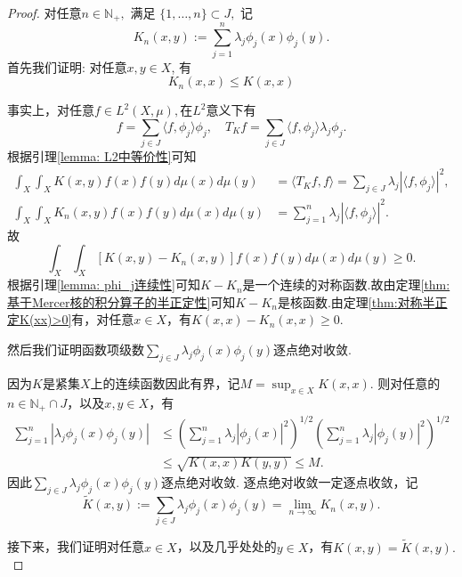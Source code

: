 \documentclass[12pt, a4paper, oneside]{ctexbook}
\begin{document}
\begin{proof}
     对任意$n\in\mathbb N_+,$ 满足 $\{1,\dots,n\} \subset J,$ 记
$$K_{n}(x,y) := \sum_{j=1}^{n} \lambda_{j} \phi_{j}(x) \phi_{j}(y).$$
首先我们证明: 对任意$ x,y \in X$, 有
$$
K_{n}(x,x) \leq K(x,x)
$$

事实上，对任意$f\in L^2(X,\mu),$在$L^2$意义下有
\begin{equation*}
    f=\sum_{j\in J}\langle f,\phi_j\rangle\phi_j,\quad T_Kf=\sum_{j\in J}\langle f,\phi_j\rangle\lambda_j\phi_j.
\end{equation*}
根据引理\ref{lemma: L2中等价性}可知
\begin{align*}
    \int_{X}\int_{X}K(x,y)f(x)f(y)d\mu(x)d\mu(y) & =\langle T_{K}f,f\rangle=\sum_{j\in J}\lambda_{j}|\langle f,\phi_{j}\rangle|^{2}, \\
\int_{X}\int_{X}K_{n}(x,y)f(x)f(y)d\mu(x)d\mu(y) & =\sum_{j=1}^n\lambda_j|\langle f,\phi_j\rangle|^2.
\end{align*}
故
\begin{equation*}
    \int_X\int_X[K(x,y)-K_n(x,y)]f(x)f(y)d\mu(x)d\mu(y)\geq0.
\end{equation*}
根据引理\eqref{lemma: phi_j连续性}可知$K-K_n$是一个连续的对称函数.故由定理\ref{thm:基于Mercer核的积分算子的半正定性}可知$K-K_n$是核函数.由定理\ref{thm:对称半正定K(xx)>0}有，对任意$x\in X$，有$K(x,x)-K_n(x,x)\geq 0$.


然后我们证明函数项级数$\sum_{j\in J} \lambda_j \phi_j(x)\phi_j(y)$逐点绝对收敛. 

因为$K$是紧集$X$上的连续函数因此有界，记$M = \sup_{x\in X} K(x,x)$. 则对任意的$n\in \mathbb{N}_+\cap J$，以及$x,y\in X$，有
\begin{align}\label{eq:K_n的有界性}
    \sum_{j=1}^n |\lambda_j\phi_j(x)\phi_j(y)|&\leq \left(\sum_{j=1}^n\lambda_j|\phi_j(x)|^2\right)^{1/2}\left(\sum_{j=1}^n\lambda_j|\phi_j(y)|^2\right)^{1/2} \nonumber\\
    &\leq \sqrt{K(x,x)K(y,y)}\leq M .
\end{align}
因此$\sum_{j\in J} \lambda_j \phi_j(x)\phi_j(y)$逐点绝对收敛.
逐点绝对收敛一定逐点收敛，记
$$\widetilde{K}(x,y):=\sum_{j\in J}\lambda_j\phi_j(x)\phi_j(y)=\lim_{n\to\infty}K_n(x,y).$$

接下来，我们证明对任意$x\in X$，以及几乎处处的$y\in X$，有$K(x,y)= \widetilde{K}(x,y).$


\end{proof}
\end{document}
